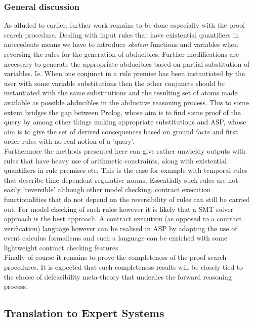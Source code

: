 \subsubsection{General discussion}
As alluded to earlier, further work remains to be done especially with the proof search procedure. Dealing with input rules that have existential quantifiers in antecedents means we have to introduce \emph{skolem} functions and variables when reversing the rules for the generation of abducibles. Further modifications are necessary to generate the appropriate abducibles based on partial substitution of variables. Ie. When one conjunct in a rule premise has been instantiated by the user with some variable substitutions then the other conjuncts should be instantiated with the same substitutions and the resulting set of atoms made available as possible abducibles in the  abductive reasoning process. This to some extent bridges the gap between Prolog, whose aim is to find some proof of the query by among other things making appropriate substitutions and ASP, whose aim is to give the set of derived consequences based on ground facts and first order rules with no real notion of a 'query'.\\
Furthermore the methods presented here can give rather unwieldy outputs with rules that have heavy use of arithmetic constraints, along with existential quantifiers in rule premises etc. This is the case for example with temporal rules that describe time-dependent regulative norms. Essentially such rules are not easily 'reversible' although other model checking, contract execution functionalities that do not depend on the reversibility of rules can still be carried out. For model checking of such rules however it is likely that a SMT solver approach is the best approach. A contract execution (as opposed to a contract verification) language however can be realised in ASP by adapting the use of event calculus formalisms and such a language can be enriched with some lightweight contract checking features.\\
Finally of course it remains to prove the completeness of the proof search procedures. It is expected that such completeness results will be closely tied to the choice of defeasibility meta-theory that underlies the forward reasoning process.
\subsection{Translation to Expert Systems}\label{sec:translation_expertsystem}



